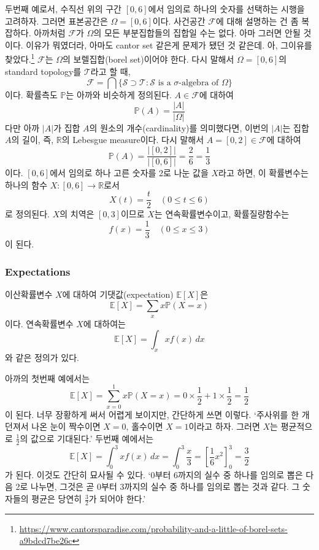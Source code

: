 \documentclass{article}
\begin{document}
두번째 예로서, 수직선 위의 구간 \([0,6]\)에서 임의로 하나의 숫자를 선택하는 시행을 고려하자.
그러면 표본공간은 \(\Omega=[0,6]\)이다.
사건공간 \(\mathcal F\)에 대해 설명하는 건 좀 복잡하다.
아까처럼 \(\mathcal F\)가 \(\Omega\)의 모든 부분집합들의 집합일 수는 없다.
아마 그러면 안될 것이다. 이유가 뭐였더라, 아마도 cantor set 같은게 문제가 됐던 것 같은데.
아, 그이유를 찾았다.\footnote{\url{https://www.cantorsparadise.com/probability-and-a-little-of-borel-sets-a9bdcd7be26c}}
\(\mathcal F\)는 \(\Omega\)의 보렐집합(borel set)이어야 한다.
다시 말해서 \(\Omega=[0,6]\)의 standard topology를 \(\mathcal T\)라고 할 때,
\[\mathcal F=\bigcap\{\mathcal S\supset\mathcal T:\mathcal S\text{ is a \(\sigma\)-algebra of \(\Omega\)}\}\]
이다.
확률측도 \(\mathbb P\)는 아까와 비슷하게 정의된다.
\(A\in\mathcal F\)에 대하여
\[\mathbb P(A)=\frac{|A|}{|\Omega|}\]
다만 아까 \(|A|\)가  집합 \(A\)의 원소의 개수(cardinality)를 의미했다면, 이번의 \(|A|\)는 집합 \(A\)의 길이, 즉, \(\mathbb R\)의 Lebesgue measure이다.
다시 말해서 \(A=[0,2]\in\mathcal F\)에 대하여
\[\mathbb P(A)=\frac{|[0,2]|}{|[0,6]|}=\frac26=\frac13\]
이다.
\([0,6]\)에서 임의로 하나 고른 숫자를 2로 나눈 값을 \(X\)라고 하면, 이 확률변수는 하나의 함수 \(X:[0,6]\to\mathbb R\)로서
\[X(t)=\frac t2\quad(0\le t\le6)\]
로 정의된다.
\(X\)의 치역은 \([0,3]\)이므로 \(X\)는 연속확률변수이고, 확률질량함수는
\[f(x)=\frac13\quad(0\le x\le3)\]
이 된다.

%
\subsubsection{Expectations}
이산확률변수 \(X\)에 대하여 기댓값(expectation) \(\mathbb E[X]\)은
\[\mathbb E[X]=\sum_xx\mathbb P(X=x)\]
이다.
연속확률변수 \(X\)에 대하여는
\[\mathbb E[X]=\int_xxf(x)\,dx\]
와 같은 정의가 있다.

아까의 첫번째 예에서는
\[\mathbb E[X]=\sum_{x=0}^1x\mathbb P(X=x)=0\times\frac12+1\times\frac12=\frac12\]
이 된다.
너무 장황하게 써서 어렵게 보이지만, 간단하게 쓰면 이렇다.
`주사위를 한 개 던져서 나온 눈이 짝수이면 \(X=0\), 홀수이면 \(X=1\)이라고 하자.
그러면 \(X\)는 평균적으로 \(\frac12\)의 값으로 기대된다.'
두번째 예에서는
\[\mathbb E[X]=\int_0^3xf(x)\,dx=\int_0^3\frac x3=\left[\frac16x^2\right]_0^3=\frac32\]
가 된다.
이것도 간단히 묘사될 수 있다.
`0부터 6까지의 실수 중 하나를 임의로 뽑은 다음 2로 나누면, 그것은 곧 0부터 3까지의 실수 중 하나를 임의로 뽑는 것과 같다.
그 숫자들의 평균은 당연히 \(\frac32\)가 되어야 한다.'
\end{document}
